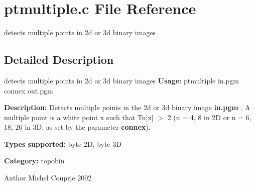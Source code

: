 \section{ptmultiple.c File Reference}
\label{ptmultiple_8c}


detects multiple points in 2d or 3d binary images  




\subsection{Detailed Description}
detects multiple points in 2d or 3d binary images {\bfseries Usage:} ptmultiple in.pgm connex out.pgm

{\bfseries Description:} Detects multiple points in the 2d or 3d binary image {\bfseries in.pgm} . A multiple point is a white point x such that Tn[x] $>$ 2 (n = 4, 8 in 2D or n = 6, 18, 26 in 3D, as set by the parameter {\bfseries connex}).

{\bfseries Types supported:} byte 2D, byte 3D

{\bfseries Category:} topobin

\begin{DoxyAuthor}{Author}
Michel Couprie 2002 
\end{DoxyAuthor}
